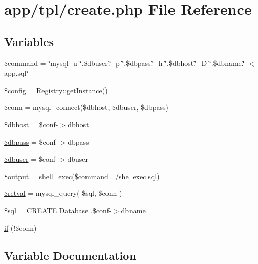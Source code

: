 \hypertarget{create_8php}{}\section{app/tpl/create.php File Reference}
\label{create_8php}
\subsection*{Variables}
\begin{DoxyCompactItemize}
\item 
\hyperlink{create_8php_a8f120409eb9f635ac30b3f9a6d5becdc}{\$command} = \char`\"{}mysql -\/u \char`\"{}.\$dbuser.\char`\"{} -\/p \char`\"{}.\$dbpass.\char`\"{} -\/h \char`\"{}.\$dbhost.\char`\"{} -\/D \char`\"{}.\$dbname.\char`\"{} $<$ app.\+sql\char`\"{}
\item 
\hyperlink{create_8php_a49c7011be9c979d9174c52a8b83e5d8e}{\$config} = \hyperlink{classRegistry_af821839861bc43bc8a24f004be8534a7}{Registry\+::get\+Instance}()
\item 
\hyperlink{create_8php_aa8a5a87b9c1a6a0819b88447cbe41877}{\$conn} = mysql\+\_\+connect(\$dbhost, \$dbuser, \$dbpass)
\item 
\hyperlink{create_8php_a580dd98ba7f04c133d1a1e1b01af4a30}{\$dbhost} = \$conf-\/$>$dbhost
\item 
\hyperlink{create_8php_a95e283b6dd5867f7b99c160bebf9826c}{\$dbpass} = \$conf-\/$>$dbpass
\item 
\hyperlink{create_8php_a8d5ac1c3396a540f025f9bbe56a5b568}{\$dbuser} = \$conf-\/$>$dbuser
\item 
\hyperlink{create_8php_a73004ce9cd673c1bfafd1dc351134797}{\$output} = shell\+\_\+exec(\$command . \textquotesingle{}/shellexec.\+sql\textquotesingle{})
\item 
\hyperlink{create_8php_ad78265bb473309fdfd2bc017c8cffe81}{\$retval} = mysql\+\_\+query( \$sql, \$conn )
\item 
\hyperlink{create_8php_a047170d6020a882807665812a27e2525}{\$sql} = \textquotesingle{}C\+R\+E\+A\+T\+E Database \textquotesingle{}.\$conf-\/$>$dbname
\item 
\hyperlink{create_8php_ac03413b0bbad0517a33ff8eb0e706f91}{if} (!\$conn)
\end{DoxyCompactItemize}


\subsection{Variable Documentation}
\hypertarget{create_8php_a8f120409eb9f635ac30b3f9a6d5becdc}{}

